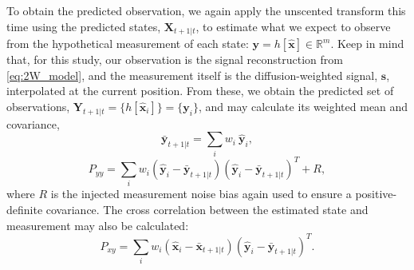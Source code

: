 \documentclass[final,hyperref]{gatech-thesis}
\renewcommand{\v}[1]{\ensuremath{\mathbf #1}\xspace}
\newcommand{\R}{\ensuremath{\mathbb R}}
\newcommand{\s}{\v s}
\newcommand{\x}{\v x}
\newcommand{\y}{\v y}
\newcommand{\X}{\v X}
\newcommand{\Y}{\v Y}
\begin{document}
To obtain the predicted observation, we again apply the unscented transform
this time using the predicted states, $\X_{t+1|t}$, to estimate what we expect
to observe from the hypothetical measurement of each state:
$\y=h[\hat{\x}] \in \R^m$.  Keep in mind that, for this study, our
observation is the signal reconstruction from \autoref{eq:2W_model}, and the
measurement itself is the diffusion-weighted signal, $\s$, interpolated at the
current position.  From these, we obtain the predicted set of observations,
$\Y_{t+1|t} = \{ h[\hat{\x}_i] \} = \{ \y_i \}$, and may calculate its
weighted mean and covariance,
\begin{equation*}
  \bar{\y}_{t+1|t} = \sum_i w_i ~ \hat{\y}_i ,
\end{equation*}
\begin{equation} \label{eq:Pyy}
  P_{yy} = \sum_i w_i \left(\hat{\y}_i - \bar{\y}_{t+1|t}\right)
                     \left(\hat{\y}_i - \bar{\y}_{t+1|t}\right)^T
           + R ,
\end{equation}
where $R$ is the injected measurement noise bias again used to ensure a
positive-definite covariance.  The cross correlation between the estimated
state and measurement may also be calculated:
\begin{equation} \label{eq:Pxy}
  P_{xy} = \sum_i w_i \left(\hat{\x}_i - \bar{\x}_{t+1|t}\right)
                     \left(\hat{\y}_i - \bar{\y}_{t+1|t}\right)^T .
\end{equation}
\end{document}
